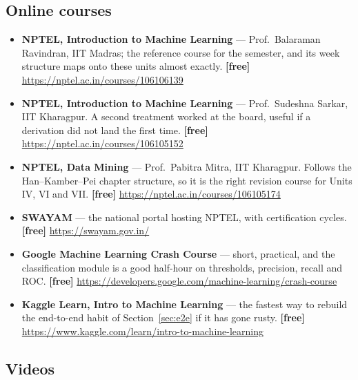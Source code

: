 \documentclass[11pt]{article}
\begin{document}
\subsection*{Online courses}

\begin{sloppypar}
\begin{itemize}[leftmargin=*]
  \item \textbf{NPTEL, Introduction to Machine Learning} --- Prof.\ Balaraman
    Ravindran, IIT Madras; the reference course for the semester, and its
    week structure maps onto these units almost exactly. \textbf{[free]}
    \url{https://nptel.ac.in/courses/106106139}
  \item \textbf{NPTEL, Introduction to Machine Learning} --- Prof.\ Sudeshna
    Sarkar, IIT Kharagpur. A second treatment worked at the board, useful if
    a derivation did not land the first time. \textbf{[free]}
    \url{https://nptel.ac.in/courses/106105152}
  \item \textbf{NPTEL, Data Mining} --- Prof.\ Pabitra Mitra, IIT Kharagpur.
    Follows the Han--Kamber--Pei chapter structure, so it is the right
    revision course for Units IV, VI and VII. \textbf{[free]}
    \url{https://nptel.ac.in/courses/106105174}
  \item \textbf{SWAYAM} --- the national portal hosting NPTEL, with
    certification cycles. \textbf{[free]} \url{https://swayam.gov.in/}
  \item \textbf{Google Machine Learning Crash Course} --- short, practical,
    and the classification module is a good half-hour on thresholds,
    precision, recall and ROC. \textbf{[free]}
    \url{https://developers.google.com/machine-learning/crash-course}
  \item \textbf{Kaggle Learn, Intro to Machine Learning} --- the fastest way
    to rebuild the end-to-end habit of Section~\ref{sec:e2e} if it has gone
    rusty. \textbf{[free]}
    \url{https://www.kaggle.com/learn/intro-to-machine-learning}
\end{itemize}
\end{sloppypar}

\subsection*{Videos}
\end{document}

